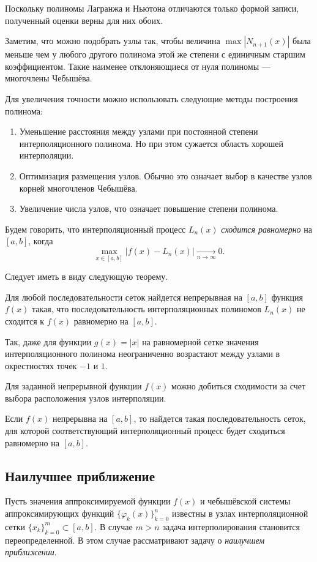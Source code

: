 Поскольку полиномы Лагранжа и Ньютона отличаются только формой записи,
полученный оценки верны для них обоих.

Заметим, что можно подобрать узлы так, чтобы величина $\max|N_{n+1}(x)|$
была меньше чем у любого другого полинома этой же степени с единичным
старшим коэффициентом. Такие наименее отклоняющиеся от нуля полиномы
--- многочлены Чебышёва.

Для увеличения точности можно использовать следующие методы построения
полинома:
\begin{enumerate}
\item Уменьшение расстояния между узлами при постоянной степени интерполяционного
полинома. Но при этом сужается область хорошей интерполяции.
\item Оптимизация размещения узлов. Обычно это означает выбор в качестве
узлов корней многочленов Чебышёва.
\item Увеличение числа узлов, что означает повышение степени полинома.
\end{enumerate}
Будем говорить, что интерполяционный процесс $L_{n}(x)$ \emph{сходится
равномерно} на $[a,b]$, когда
\[
\max_{x\in[a,b]}|f(x)-L_{n}(x)|\underset{n\rightarrow\infty}{\longrightarrow}0.
\]


Следует иметь в виду следующую теорему.
\begin{thm}
\emph{}Для любой последовательности сеток найдется непрерывная на
$[a,b]$ функция $f(x)$ такая, что последовательность интерполяционных
полиномов $L_{n}(x)$ не сходится к $f(x)$ равномерно на $[a,b]$.
\end{thm}
Так, даже для функции $g(x)=|x|$ на равномерной сетке значения интерполяционного
полинома неограниченно возрастают между узлами в окрестностях точек
$-1$ и $1$.

Для заданной непрерывной функции $f(x)$ можно добиться сходимости
за счет выбора расположения узлов интерполяции.
\begin{thm}
\emph{}Если $f(x)$ непрерывна на $[a,b]$, то найдется такая последовательность
сеток, для которой соответствующий интерполяционный процесс будет
сходиться равномерно на $[a,b]$.
\end{thm}

\subsection{Наилучшее приближение}

Пусть значения аппроксимируемой функции $f(x)$ и чебышёвской системы
аппроксимирующих функций $\{\varphi_{k}(x)\}_{k=0}^{n}$ известны
в узлах интерполяционной сетки $\{x_{k}\}_{k=0}^{m}\subset[a,b]$.
В случае $m>n$ задача интерполирования становится переопределенной.
В этом случае рассматривают задачу о \emph{наилучшем приближении}.

